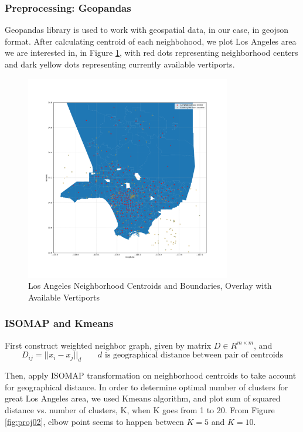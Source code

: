 \documentclass{article}
\begin{document}
\subsubsection{Preprocessing: Geopandas}
Geopandas library is used to work with geospatial data, in our case, in geojson format. After calculating centroid of each neighbohood, we plot Los Angeles area we are interested in, in Figure \ref{fig:proj01}, with red dots representing neighborhood centers and dark yellow dots representing currently available vertiports.



\begin{figure}[ht]
\centering
\includegraphics[width=0.8\textwidth]{proj01.png}
\vspace*{-10mm}
\caption{Los Angeles Neighborhood Centroids and Boundaries, Overlay with Available Vertiports }
\label{fig:proj01}
\end{figure}

\subsubsection{ISOMAP and Kmeans}
First construct weighted neighbor graph, given by matrix $D\in R^{m\times m}$, and
\[
D_{ij} = ||x_i - x_j||_d \qquad d \text{ is geographical distance between pair of centroids}
\]

Then, apply ISOMAP transformation on neighborhood centroids to take account for geographical distance. In order to determine optimal number of clusters for great Los Angeles area, we used Kmeans algorithm, and plot sum of squared distance vs. number of clusters, K, when K goes from 1 to 20. From Figure \ref{fig:proj02}, elbow point seems to happen between $K=5$ and $K=10$.
\end{document}
